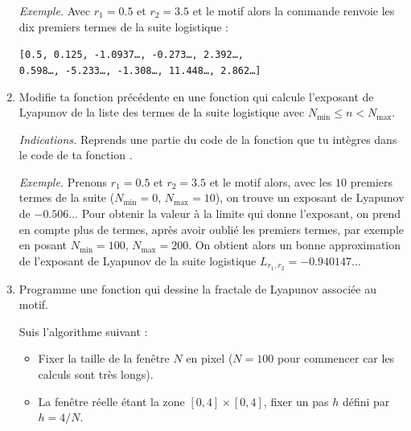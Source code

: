 \documentclass[11pt,class=report,crop=false]{standalone}
\begin{document}
\begin{activite}
\begin{enumerate}
  
  \emph{Exemple.} 
  Avec $r_1 = 0.5$ et $r_2 = 3.5$ et le motif  alors la commande 
   renvoie les dix premiers termes de la suite logistique :
  \begin{center}
  \texttt{[0.5, 0.125, -1.0937\ldots, -0.273\ldots, 2.392\ldots, \\
  0.598\ldots, -5.233\ldots, -1.308\ldots, 11.448\ldots, 2.862\ldots]
  }\end{center}

  \item Modifie ta fonction précédente en une fonction  
   qui calcule l'exposant de Lyapunov de la liste des termes de la suite logistique avec $N_{\min} \le n < N_{\max}$.
  
  \emph{Indications.} Reprends une partie du code de la fonction 
   que tu intègres dans le code de ta fonction .
  
   \emph{Exemple.} 
  Prenons $r_1 = 0.5$ et $r_2 = 3.5$ et le motif  alors, 
  avec les $10$ premiers termes de la suite ($N_{\min}=0$, $N_{\max}=10$), on trouve un exposant de Lyapunov de $-0.506\ldots$ 
  Pour obtenir la valeur à la limite qui donne l'exposant, on prend en compte plus de termes, après avoir oublié les premiers termes, par exemple en posant $N_{\min}=100$, $N_{\max}=200$. On obtient alors un bonne approximation de l'exposant de Lyapunov de la suite logistique $L_{r_1,r_2} = -0.940147\ldots$
  
 
  \item Programme une fonction  qui dessine la fractale de Lyapunov associée au motif.
  
  Suis l'algorithme suivant :
  \begin{itemize}
    \item Fixer la taille de la fenêtre $N$ en pixel ($N=100$ pour commencer car les calculs sont très longs).
    \item La fenêtre réelle étant la zone $[0,4]\times [0,4]$, fixer un pas $h$ défini par $h = 4/N$.
  

\end{itemize}
\end{enumerate}
\end{activite}
\end{document}
